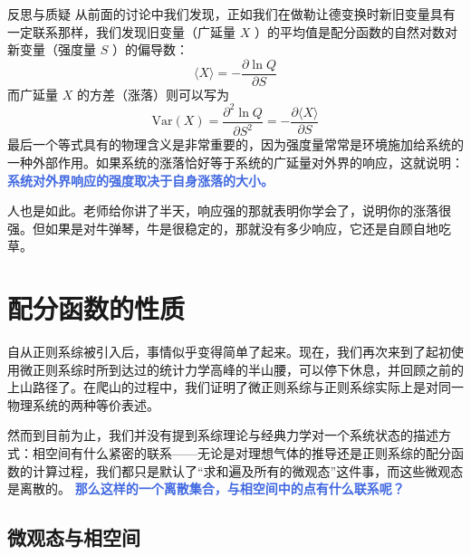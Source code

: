 \begin{justification}{\kaishu 反思与质疑}
\kaishu \fontsize{11pt}{16pt}
\quad\quad 从前面的讨论中我们发现，正如我们在做勒让德变换时新旧变量具有一定联系那样，我们发现旧变量（广延量 $X$ ）的平均值是配分函数的自然对数对新变量（强度量 $S$ ）的偏导数：
\[
    \langle X \rangle = -\frac{\partial \ln Q}{\partial S}
\]
而广延量 $X$ 的方差（涨落）则可以写为
\[
    \text{Var}(X) = \frac{\partial^2 \ln Q}{\partial S^2} = -\frac{\partial \langle X \rangle}{\partial S}
\]
最后一个等式具有的物理含义是非常重要的，因为强度量常常是环境施加给系统的一种外部作用。如果系统的涨落恰好等于系统的广延量对外界的响应，这就说明：\textcolor{RoyalBlue}{\textbf{\kaishu 系统对外界响应的强度取决于自身涨落的大小。}}

\quad\quad 人也是如此。老师给你讲了半天，响应强的那就表明你学会了，说明你的涨落很强。但如果是对牛弹琴，牛是很稳定的，那就没有多少响应，它还是自顾自地吃草。
\end{justification}

\section{配分函数的性质}\label{sec:配分函数的性质}

自从正则系综被引入后，事情似乎变得简单了起来。现在，我们再次来到了起初使用微正则系综时所到达过的统计力学高峰的半山腰，可以停下休息，并回顾之前的上山路径了。在爬山的过程中，我们证明了微正则系综与正则系综实际上是对同一物理系统的两种等价表述。

然而到目前为止，我们并没有提到系综理论与经典力学对一个系统状态的描述方式：相空间有什么紧密的联系——无论是对理想气体的推导还是正则系综的配分函数的计算过程，我们都只是默认了“求和遍及所有的微观态”这件事，而这些微观态是离散的。 \textcolor{RoyalBlue}{\textbf{\kaishu 那么这样的一个离散集合，与相空间中的点有什么联系呢？}}

\subsection{微观态与相空间}

